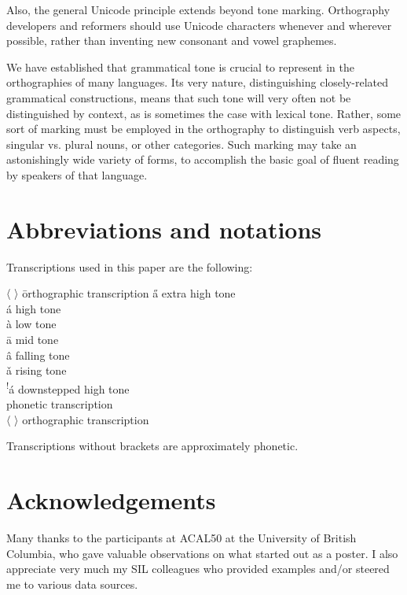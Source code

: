 \documentclass[output=paper]{langscibook}
\begin{document}
Also, the general Unicode principle extends beyond tone marking. Orthography developers and reformers should use Unicode characters whenever and wherever possible, rather than inventing new consonant and vowel graphemes.

We have established that grammatical tone is crucial to represent in the orthographies of many languages. Its very nature, distinguishing closely-related grammatical constructions, means that such tone will very often not be distinguished by context, as is sometimes the case with lexical tone. Rather, some sort of marking must be employed in the orthography to distinguish verb aspects, singular vs. plural nouns, or other categories. Such marking may take an astonishingly wide variety of forms, to accomplish the basic goal of fluent reading by speakers of that language. 



\section*{Abbreviations and notations}\largerpage

Transcriptions used in this paper are the following: 

\begin{multicols}{2}
\begin{tabbing}
 〈 〉 \hspace{1ex}\= orthographic transcription\kill
 a̋ \> extra high tone\\
 á \> high tone\\
 à \> low tone\\
 ā \> mid tone\\
 â \> falling tone\\
 ǎ \> rising tone\\
 \textsuperscript{!}á \> downstepped high tone\\\relax
 [ ] \> phonetic transcription\\
 〈 〉 \> orthographic transcription
\end{tabbing}
\end{multicols}

\noindent Transcriptions without brackets are approximately phonetic.


\section*{Acknowledgements}

Many thanks to the participants at ACAL50 at the University of British Columbia, who gave valuable observations on what started out as a poster. I also appreciate very much my SIL colleagues who provided examples and/or steered me to various data sources.


{\sloppy\printbibliography[heading=subbibliography,notkeyword=this]}
\end{document}
